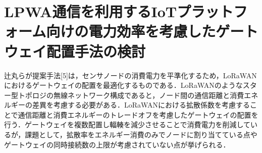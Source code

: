 \section{LPWA通信を利用するIoTプラットフォーム向けの電力効率を考慮したゲートウェイ配置手法の検討}
辻丸らが提案手法[5]は，センサノードの消費電力を平準化するため，LoRaWANにおけるゲートウェイの配置を最適化するものである．LoRaWANのようなスター型トポロジの無線ネットワーク構成であると，ノード間の通信距離と消費エネルギーの差異を考慮する必要がある．LoRaWANにおける拡散係数を考慮することで通信距離と消費エネルギーのトレードオフを考慮したゲートウェイの配置を行う．ゲートウェイを複数配置し輻輳を減少させることで消費電力を削減しているが，課題として，拡散率をエネルギー消費のみでノードに割り当てている点やゲートウェイの同時接続数の上限が考慮されていない点が挙げられる．